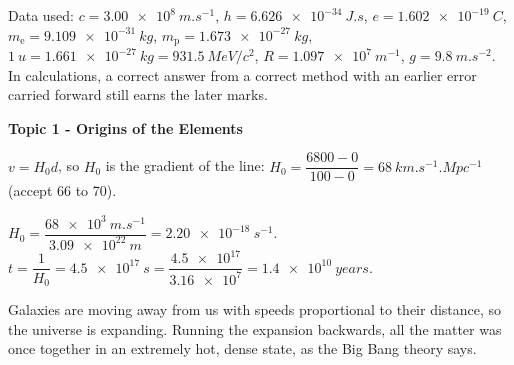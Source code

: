 \documentclass[12pt]{article}
\newcommand\anstopic[1]{\par\Needspace{8\baselineskip}\vspace{4mm}%
  \begin{center}{\headfont\bfseries\fontsize{14}{18}\selectfont #1\par}\end{center}\vspace{2pt}}
\begin{document}

Data used: $c = \qty{3.00e8}{m.s^{-1}}$, $h = \qty{6.626e-34}{J.s}$, $e = \qty{1.602e-19}{C}$,
$m_\mathrm{e} = \qty{9.109e-31}{kg}$, $m_\mathrm{p} = \qty{1.673e-27}{kg}$,
$\qty{1}{u} = \qty{1.661e-27}{kg} = \qty{931.5}{MeV}/c^2$, $R = \qty{1.097e7}{m^{-1}}$, $g = \qty{9.8}{m.s^{-2}}$.
In calculations, a correct answer from a correct method with an earlier error carried forward still earns
the later marks.

\anstopic{Topic 1 - Origins of the Elements}

\ansq
{}
\begin{crit}
\end{crit}
\sample
$v = H_0 d$, so $H_0$ is the gradient of the line:
$H_0 = \dfrac{6800 - 0}{100 - 0} = \qty{68}{km.s^{-1}.Mpc^{-1}}$ (accept 66 to 70).
\begin{crit}
\end{crit}
\sample
$H_0 = \dfrac{\qty{68e3}{m.s^{-1}}}{\qty{3.09e22}{m}} = \qty{2.20e-18}{s^{-1}}$. \quad
$t = \dfrac{1}{H_0} = \qty{4.5e17}{s} = \dfrac{\num{4.5e17}}{\num{3.16e7}} = \qty{1.4e10}{years}$.
\begin{crit}
\end{crit}
\sample
Galaxies are moving away from us with speeds proportional to their distance, so the universe is
expanding. Running the expansion backwards, all the matter was once together in an extremely hot, dense
state, as the Big Bang theory says.
\end{document}
